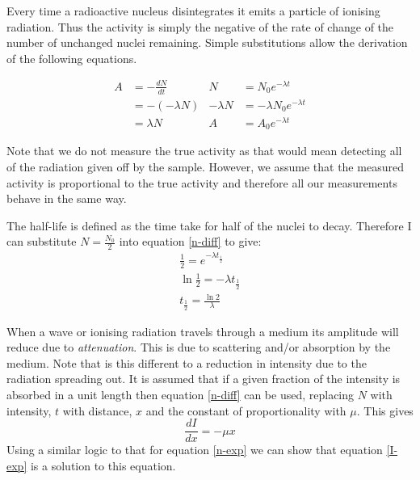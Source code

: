 \documentclass[revision-guide.tex]{subfiles}
\begin{document}
Every time a radioactive nucleus disintegrates it emits a particle of ionising radiation. Thus the activity is simply the negative of the rate of change of the number of unchanged nuclei remaining. Simple substitutions allow the derivation of the following equations.

\begin{align*}
A &= -\frac{dN}{dt} & N &= N_0 e^{-\lambda t} \\
&= -(-\lambda N) & -\lambda N &= -\lambda N_0 e^{-\lambda t} \\
&= \lambda N & A &= A_0e^{-\lambda t}
\end{align*}

Note that we do not measure the true activity as that would mean detecting all of the radiation given off by the sample. However, we assume that the measured activity is proportional to the true activity and therefore all our measurements behave in the same way.


The half-life is defined as the time take for half of the nuclei to decay. Therefore I can substitute $N = \frac{N_0}{2}$ into equation \ref{n-diff} to give:
\begin{align*}
\frac{1}{2} = e^{-\lambda t_\frac{1}{2}}  \\
\ln{\frac{1}{2}} = -\lambda t_\frac{1}{2} \\
t_\frac{1}{2} = \frac{\ln{2}}{\lambda}
\end{align*}



When a wave or ionising radiation travels through a medium its amplitude will reduce due to \emph{attenuation}. This is due to scattering and/or absorption by the medium. Note that is this different to a reduction in intensity due to the radiation spreading out. It is assumed that if a given fraction of the intensity is absorbed in a unit length then equation \ref{n-diff} can be used, replacing $N$ with intensity, $t$ with distance, $x$ and the constant of proportionality with $\mu$. This gives
\begin{equation} \label{I-diff}
\frac{dI}{dx} = -\mu x
\end{equation}
Using a similar logic to that for equation \ref{n-exp} we can show that equation \ref{I-exp} is a solution to this equation.
\end{document}
